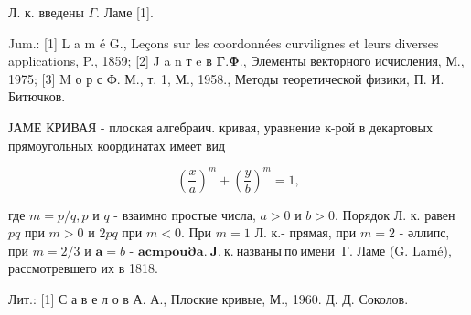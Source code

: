 \documentclass[10pt]{article}
\begin{document}
Л. к. введены $\Gamma$. Ламе [1].



Jum.: [1] L a m é G., Leçons sur les coordonnées curvilignes et leurs diverses applications, P., 1859; [2] J a n т e в $\mathbf{\Gamma} . \mathbf{\Phi} .$, Элементы векторного исчисления, М., 1975; [3] M о р с Ф. М., т. 1, М., 1958., Методы теоретической физики, П. И. Битючков.



ЈАМЕ КРИВАЯ - плоская алгебраич. кривая, уравнение к-рой в декартовых прямоугольных координатах имеет вид



\[

\left(\frac{x}{a}\right)^{m}+\left(\frac{y}{b}\right)^{m}=1,

\]



где $m=p / q, p$ и $q$ - взаимно простые числа, $a>0$ и $b>0$. Порядок Л. к. равен $p q$ при $m>0$ и $2 p q$ при $m<0$. При $m=1$ Л. к.- прямая, при $m=2$ - әллипс, при $m=2 / 3$ и $\boldsymbol{a}=b$ - $\boldsymbol{a c m p o u \partial a . ~ J . ~ к . ~ н а з в а н ы ~ п о ~ и м е н и ~}$ Г. Ламе (G. Lamé), рассмотревшего их в 1818.



Лит.: [1] С а в е л о в А. А., Плоские кривые, М., 1960. Д. Д. Соколов.
\end{document}
